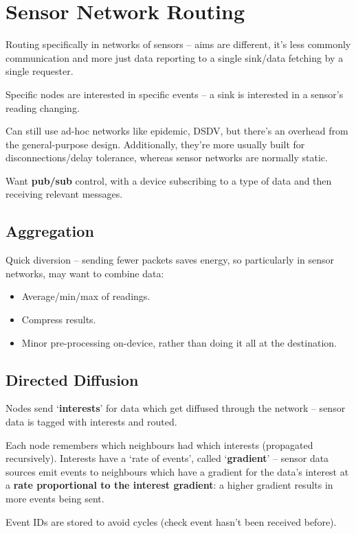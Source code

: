 \documentclass[a4paper, 11pt]{article}
\begin{document}
\section*{Sensor Network Routing}
{
    Routing specifically in networks of sensors -- aims are different, it's less commonly communication and more just data reporting to a single sink/data fetching by a single requester.

    Specific nodes are interested in specific events -- a sink is interested in a sensor's reading changing.

    Can still use ad-hoc networks like epidemic, DSDV, but there's an overhead from the general-purpose design. Additionally, they're more usually built for disconnections/delay tolerance, whereas sensor networks are normally static.

    Want \textbf{pub/sub} control, with a device subscribing to a type of data and then receiving relevant messages.

    \subsection*{Aggregation}
    {
        Quick diversion -- sending fewer packets saves energy, so particularly in sensor networks, may want to combine data:
        \begin{itemize}
        \item Average/min/max of readings.
        \item Compress results.
        \item Minor pre-processing on-device, rather than doing it all at the destination.
        \end{itemize}
    }
    \subsection*{Directed Diffusion}
    {
        Nodes send `\textbf{interests}' for data which get diffused through the network -- sensor data is tagged with interests and routed.

        Each node remembers which neighbours had which interests (propagated recursively). Interests have a `rate of events', called `\textbf{gradient}' -- sensor data sources emit events to neighbours which have a gradient for the data's interest at a \textbf{rate proportional to the interest gradient}: a higher gradient results in more events being sent.

        Event IDs are stored to avoid cycles (check event hasn't been received before).

}}
\end{document}
